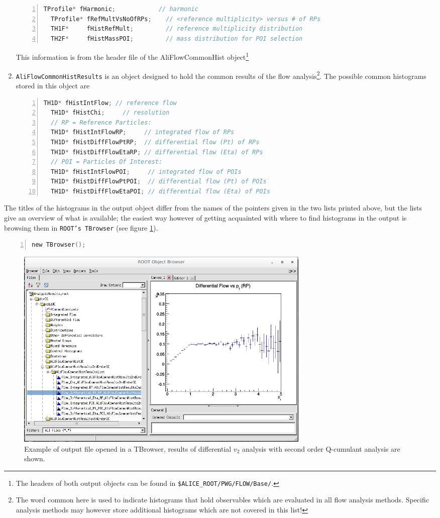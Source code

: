 \documentclass[a4paper]{book}
\numberwithin{equation}{subsection}
\begin{document}
\begin{enumerate}
\begin{lstlisting}[language=C, numbers=left]
  TProfile* fHarmonic;            // harmonic 
  TProfile* fRefMultVsNoOfRPs;    // <reference multiplicity> versus # of RPs
  TH1F*     fHistRefMult;         // reference multiplicity distribution
  TH2F*     fHistMassPOI;         // mass distribution for POI selection \end{lstlisting}
  This information is from the header file of the AliFlowCommonHist object\footnote{The headers of both output objects can be found in \texttt{\$ALICE\_ROOT/PWG/FLOW/Base/}.}
  \item \texttt{AliFlowCommonHistResults} is an object designed to hold the common results of the flow analysis\footnote{The word common here is used to indicate histograms that hold observables which are evaluated in all flow analysis methods. Specific analysis methods may however store additional histograms which are not covered in this list!}. The possible common histograms stored in this object are
  \begin{lstlisting}[language=C, numbers=left]
  TH1D* fHistIntFlow; // reference flow
  TH1D* fHistChi;     // resolution
  // RP = Reference Particles:  
  TH1D* fHistIntFlowRP;     // integrated flow of RPs
  TH1D* fHistDiffFlowPtRP;  // differential flow (Pt) of RPs
  TH1D* fHistDiffFlowEtaRP; // differential flow (Eta) of RPs
  // POI = Particles Of Interest:
  TH1D* fHistIntFlowPOI;     // integrated flow of POIs
  TH1D* fHistDiffFlowPtPOI;  // differential flow (Pt) of POIs
  TH1D* fHistDiffFlowEtaPOI; // differential flow (Eta) of POIs \end{lstlisting}
  
  \end{enumerate}
  The titles of the histograms in the output object differ from the names of the pointers given in the two lists printed above, but the lists give an overview of what is available; the easiest way however of getting acquainted with where to find histograms in the output is browsing them in \texttt{ROOT's TBrowser} (see figure \ref{fig:browserExample}).
  \begin{lstlisting}[language=C, numbers=left]
  new TBrowser(); \end{lstlisting}
\begin{figure}
 \includegraphics[width=0.70\textwidth]{figs/browserExample.png}
 \caption[TBrowser with output file]{Example of output file opened in a TBrowser, results of differential $v_2$ analysis with second order Q-cumulant analysis are shown.}
 \label{fig:browserExample}
\end{figure}
\end{document}
